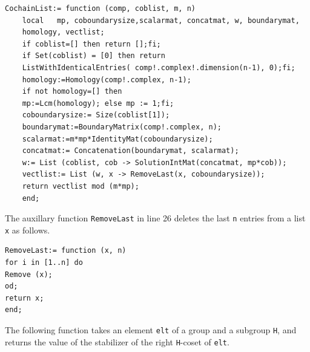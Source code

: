 \documentclass[a4paper, 10pt]{book}
\theoremstyle{definition}
\numberwithin{equation}{chapter}
\begin{document}
\begin{lstlisting}
CochainList:= function (comp, coblist, m, n) 
	local   mp, coboundarysize,scalarmat, concatmat, w, boundarymat, 
	homology, vectlist;
	if coblist=[] then return [];fi;
	if Set(coblist) = [0] then return 
	ListWithIdenticalEntries( comp!.complex!.dimension(n-1), 0);fi;
	homology:=Homology(comp!.complex, n-1);
	if not homology=[] then
	mp:=Lcm(homology); else mp := 1;fi;
	coboundarysize:= Size(coblist[1]);
	boundarymat:=BoundaryMatrix(comp!.complex, n);
	scalarmat:=m*mp*IdentityMat(coboundarysize);
	concatmat:= Concatenation(boundarymat, scalarmat); 
	w:= List (coblist, cob -> SolutionIntMat(concatmat, mp*cob));
	vectlist:= List (w, x -> RemoveLast(x, coboundarysize));
	return vectlist mod (m*mp);
	end;
\end{lstlisting}
The auxillary function \lstinline{RemoveLast} in line 26 deletes the last \lstinline{n} entries from a list \lstinline{x} as follows.
\begin{lstlisting}
RemoveLast:= function (x, n)
for i in [1..n] do
Remove (x);
od;
return x;
end;
\end{lstlisting}

The following function takes an element \lstinline{elt} of a group and a subgroup \lstinline{H}, and returns the value of the stabilizer of the right \lstinline{H}-coset of \lstinline{elt}.
\end{document}
